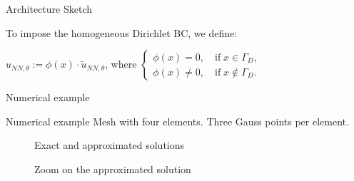 \begin{frame}{Architecture Sketch}
\begin{tikzpicture}[shorten >=1pt,->,draw=black!50, node distance=\layersep]
\end{tikzpicture}

\vspace{0.2cm}
\small To impose the homogeneous Dirichlet BC, we define:

$u_{NN, \theta} := \phi(x) \cdot \tilde{u}_{NN, \theta}$, where 
$ \left\{
\begin{array}{l}
\phi(x) = 0,  \quad \text{if} \; x \in \Gamma_D,\\ 
\phi(x) \neq 0, \quad \text{if} \; x \not \in \Gamma_D.
\end{array}
\right.$
\end{frame}


\begin{frame}[t]{Numerical example}
 

\end{frame}


\begin{frame}[t]{Numerical example}
Mesh with four elements. Three Gauss points per element.
\vspace{0.5cm}

\begin{minipage}{.4\textwidth}
\begin{figure}[!htp]
\centering
 
\caption*{Exact and approximated solutions}
	\label{fig:ritz_exact}
 \end{figure}
\end{minipage}%
\begin{minipage}{.2\textwidth}
\center
\vspace{-2.5cm}
\end{minipage}%
\begin{minipage}{.4\textwidth}
\begin{figure}[!htp]
\centering
 
\caption*{Zoom on the approximated solution}
	\label{fig:ritz_exact}
 \end{figure}
\end{minipage}%
\end{frame}


